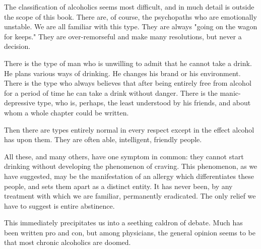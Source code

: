 \begin{biblechapter}
    The classification of alcoholics seems most difficult, 
    and in much detail is outside the scope of this book. 
\verse There are, of course, the psychopaths who are emotionally unstable. 
\verse We are all familiar with this type. 
\verse They are always "going on the wagon for keeps." 
\verse They are over-remorseful and make many resolutions, but never a decision.

\verse There is the type of man who is unwilling to admit that he cannot take a drink. 
\verse He plans various ways of drinking. 
\verse He changes his brand or his environment. 
\verse There is the type who always believes that 
    after being entirely free from alcohol for a period of time 
    he can take a drink without danger. 
\verse There is the manic-depressive type, who is, perhaps, 
    the least understood by his friends, 
    and about whom a whole chapter could be written.

\verse Then there are types entirely normal in every respect 
    except in the effect alcohol has upon them. 
\verse They are often able, intelligent, friendly people.

\verse All these, and many others, have one symptom in common: 
    they cannot start drinking without developing the phenomenon of craving. 
\verse This phenomenon, as we have suggested, 
    may be the manifestation of an allergy which differentiates these people, 
    and sets them apart as a distinct entity. 
\verse It has never been, by any treatment with which we are familiar, permanently eradicated. 
\verse The only relief we have to suggest is entire abstinence.

\verse This immediately precipitates us into a seething caldron of debate. 
\verse Much has been written pro and con, but among physicians, 
    the general opinion seems to be that most chronic alcoholics are doomed.
\end{biblechapter}


